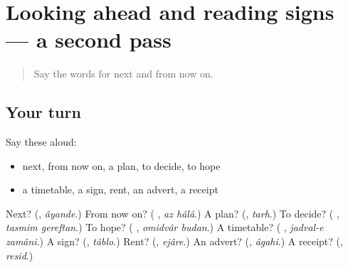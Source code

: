\section[(dialogue)]{Looking ahead and reading signs — a second pass}

\label{lesson:FA-R139-second-pass-looking-ahead-and-reading-signs}



\begin{quote}
Say the words for next and from now on.
\end{quote}

\subsection*{Your turn}
Say these aloud:

\begin{itemize}
\raggedright
  \item next, from now on, a plan, to decide, to hope
  \item a timetable, a sign, rent, an advert, a receipt
\end{itemize}

\begin{tcolorbox}[breakable,colback=teal!4,colframe=teal!35!black,title={Before you move on}]
Next? (\textbf{}, \emph{âyande}.) From now on? (\textbf{ }, \emph{az hâlâ}.) A plan? (\textbf{}, \emph{tarh}.) To decide? (\textbf{ }, \emph{tasmim gereftan}.) To hope? (\textbf{ }, \emph{omidvâr budan}.) A timetable? (\textbf{ }, \emph{jadval-e zamâni}.) A sign? (\textbf{}, \emph{tâblo}.) Rent? (\textbf{}, \emph{ejâre}.) An advert? (\textbf{}, \emph{âgahi}.) A receipt? (\textbf{}, \emph{resid}.)
\end{tcolorbox}
